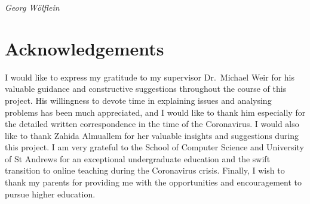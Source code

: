\vspace{0.5cm}

\textit{Georg Wölflein}

\chapter*{Acknowledgements}
I would like to express my gratitude to my supervisor Dr.~Michael Weir for his valuable guidance and constructive suggestions throughout the course of this project. 
His willingness to devote time in explaining issues and analysing problems has been much appreciated, and I would like to thank him especially for the detailed written correspondence in the time of the Coronavirus.
I would also like to thank Zahida Almuallem for her valuable insights and suggestions during this project.
I am very grateful to the School of Computer Science and University of St Andrews for an exceptional undergraduate education and the swift transition to online teaching during the Coronavirus crisis.
Finally, I wish to thank my parents for providing me with the opportunities and encouragement to pursue higher education.

\tableofcontents
\listoffigures

